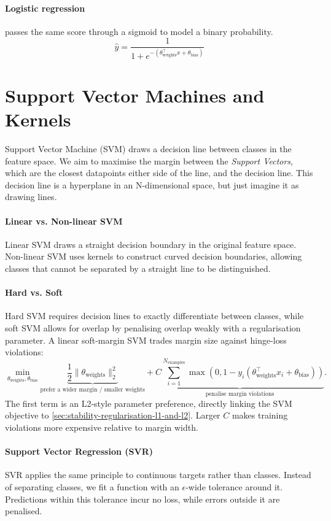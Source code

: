 \paragraph{Logistic regression} passes the same score through a sigmoid to model a binary probability.
\[
    \hat y = \frac{1}{1 + e^{-(\theta_{\text{weights}}^\top x + \theta_{\text{bias}})}}
\]



\section{Support Vector Machines and Kernels}
\label{sec:models-support-vector-machines-and-kernels}
Support Vector Machine (SVM) draws a decision line between classes in the feature space.
We aim to maximise the margin between the \textit{Support Vectors}, which are the closest datapoints either side of the line, and the decision line. 
This decision line is a hyperplane in an N-dimensional space, but just imagine it as drawing lines.


\paragraph{Linear vs. Non-linear SVM}
Linear SVM draws a straight decision boundary in the original feature space. Non-linear SVM uses kernels to construct curved decision boundaries, allowing classes that cannot be separated by a straight line to be distinguished.


\paragraph{Hard vs. Soft}
Hard SVM requires decision lines to exactly differentiate between classes, while soft SVM allows for overlap by penalising overlap weakly with a regularisation parameter.
A linear soft-margin SVM trades margin size against hinge-loss violations:
\[
    \min_{\theta_{\text{weights}},\theta_{\text{bias}}}
    \underbrace{\frac12\|\theta_{\text{weights}}\|_2^2}_{\text{prefer a wider margin / smaller weights}}
    +
    \underbrace{C\sum_{i=1}^{N_{\text{examples}}}
    \max\!\left(0,1-y_i(\theta_{\text{weights}}^\top x_i+\theta_{\text{bias}})\right)}_{\text{penalise margin violations}}.
\]
The first term is an L2-style parameter preference, directly linking the SVM objective to \cref{sec:stability-regularisation-l1-and-l2}.
Larger $C$ makes training violations more expensive relative to margin width.

\paragraph{Support Vector Regression (SVR)}
SVR applies the same principle to continuous targets rather than classes.
Instead of separating classes, we fit a function with an $\epsilon$-wide tolerance around it. 
Predictions within this tolerance incur no loss, while errors outside it are penalised.


